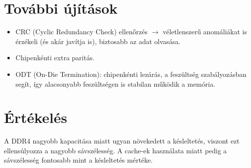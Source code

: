 \section{További újítások}
\begin{itemize}
    \item CRC (Cyclic Redundancy Check) ellenőrzés $\rightarrow$ véletlenszerű anomáliákat is érzékeli (és akár javítja is), biztosabb az adat olvasása.
    \item Chipenkénti extra paritás.
    \item ODT (On-Die Termination): chipenkénti lezárás, a feszültség szabályozásban segít, így alacsonyabb feszültségen is stabilan működik a memória.
\end{itemize}

\section{Értékelés}
A DDR4 nagyobb kapacitása miatt ugyan növekedett a késleltetés, viszont ezt ellensúlyozza a nagyobb sávszélesség.
A cache-ek használata miatt pedig a sávszélesség fontosabb mint a késleltetés mértéke.